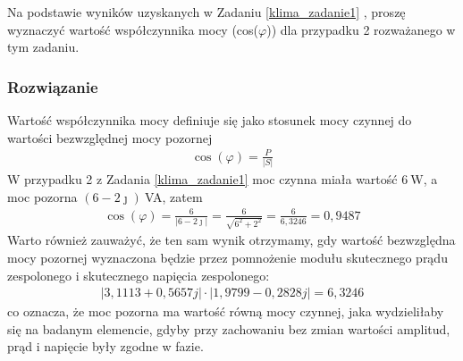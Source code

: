
\begin{task}
Na podstawie wyników uzyskanych w Zadaniu \ref{klima_zadanie1} , proszę wyznaczyć wartość współczynnika mocy (cos($\varphi$)) dla przypadku 2 rozważanego w tym zadaniu.
\subsubsection{Rozwiązanie}
Wartość współczynnika mocy definiuje się jako stosunek mocy czynnej do wartości bezwzględnej mocy pozornej
\begin{align}
\cos(\varphi)=\frac{P}{|S|}
\end{align}
W przypadku 2 z Zadania \ref{klima_zadanie1} moc czynna miała wartość 6$\:$W, a moc pozorna $(6-2 \jmath)\:$VA, zatem 
\begin{align}
\cos(\varphi)=\frac{6}{|6-2 \jmath|}=\frac{6}{\sqrt{6^2+2^2}}=\frac{6}{6,3246}=0,9487
\end{align}
Warto również zauważyć, że ten sam wynik otrzymamy, gdy wartość bezwzględna mocy pozornej wyznaczona będzie przez pomnożenie modułu skutecznego prądu zespolonego i skutecznego napięcia zespolonego:
\begin{align}
|3,1113+0,5657j|\cdot |1,9799-0,2828j|=6,3246
\end{align}
co oznacza, że moc pozorna ma wartość równą mocy czynnej, jaka wydzieliłaby się na badanym elemencie, gdyby przy zachowaniu bez zmian wartości amplitud, prąd i napięcie były zgodne w fazie.
\end{task}